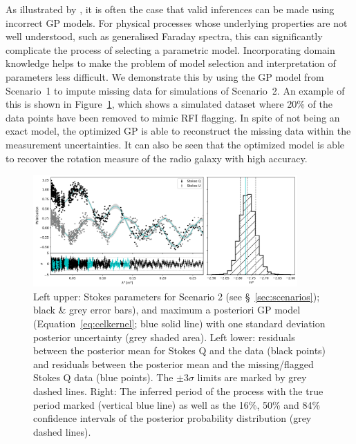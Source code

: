 \documentclass[fleqn,usenatbib]{mnras}
\begin{document}
As illustrated by \cite{celerite}, it is often the case that valid inferences can be made using incorrect GP models. For physical processes whose underlying properties are not well understood, such as generalised Faraday spectra, this can significantly complicate the process of selecting a parametric model. Incorporating domain knowledge helps to make the problem of model selection and interpretation of parameters less difficult. We demonstrate this by using the GP model from Scenario~1 to impute missing data for simulations of Scenario~2. An example of this is shown in Figure~\ref{fig:scenario2}, which shows a simulated dataset where 20\% of the data points have been removed to mimic RFI flagging. In spite of not being an exact model, the optimized GP is able to reconstruct the missing data within the measurement uncertainties. It can also be seen that the optimized model is able to recover the rotation measure of the radio galaxy with high accuracy. 
%
\begin{figure}
\includegraphics[width=0.9\textwidth]{./FIGURES/diff_case2_minus30_n0p1.png}
\caption{\label{fig:scenario2} Left upper: Stokes parameters for Scenario 2 (see \S~\ref{sec:scenarios}); black \& grey error bars), and maximum a posteriori GP model (Equation~\ref{eq:celkernel}; blue solid line) with one standard deviation posterior uncertainty (grey shaded area). Left lower: residuals between the posterior mean for Stokes Q and the data (black points) and residuals between the posterior mean and the missing/flagged Stokes Q data (blue points). The $\pm3\sigma$ limits are marked by grey dashed lines. Right: The inferred period of the process with the true period marked (vertical blue line) as well as the 16\%, 50\% and 84\% confidence intervals of the posterior probability distribution (grey dashed lines).}
\end{figure}
\end{document}
